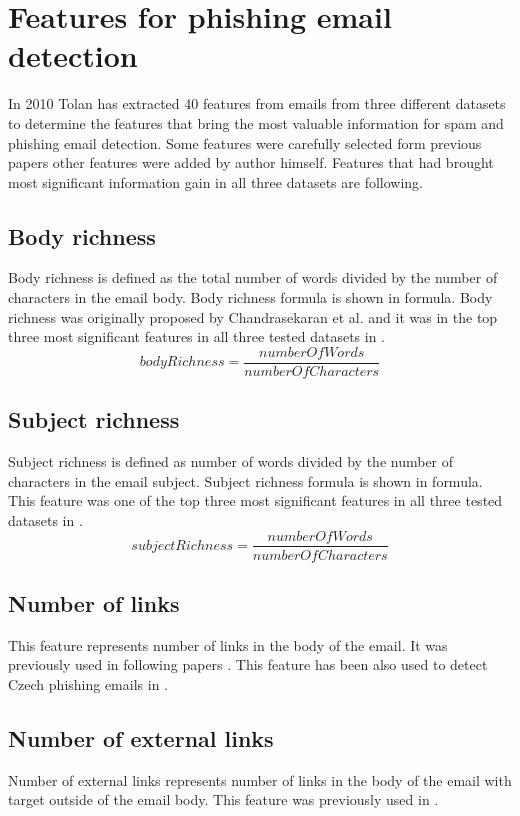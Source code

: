 \documentclass[thesis=B,english]{FITthesis}[2012/10/20]
\begin{document}
\section{Features for phishing email detection} \label{features}
In 2010 Tolan has extracted 40 features from emails from three different datasets to determine the features that bring the most valuable information for spam and phishing email detection. \cite{ultimateFeatureBreakdown} Some features were carefully selected form previous papers other features were added by author himself. Features that had brought most significant information gain in all three datasets are following.

\subsection{Body richness} \label{bodyrichnes}
Body richness is defined as the total number of words divided by the number of characters in the email body. Body richness formula is shown in formula. Body richness was originally proposed by Chandrasekaran et al. \cite{features2006Chandrasekaran} and it was in the top three most significant features in all three tested datasets in \cite{ultimateFeatureBreakdown}.
\[ bodyRichness = \frac{numberOfWords}{numberOfCharacters} \]

\subsection{Subject richness}
Subject richness is defined as number of words divided by the number of characters in the email subject. Subject richness formula is shown in formula. This feature was one of the top three most significant features in all three tested datasets in \cite{ultimateFeatureBreakdown}.
\[ subjectRichness = \frac{numberOfWords}{numberOfCharacters} \]

\subsection{Number of links}
This feature represents number of links in the body of the email. It was previously used in following papers \cite{fette2007learning} \cite{featuresBergholz2008improved}. This feature has been also used to detect Czech phishing emails in \cite{vitListik2015detekce}.

\subsection{Number of external links}
Number of external links represents number of links in the body of the email with target outside of the email body. This feature was previously used in \cite{featuresBergholz2008improved}. 
\end{document}
